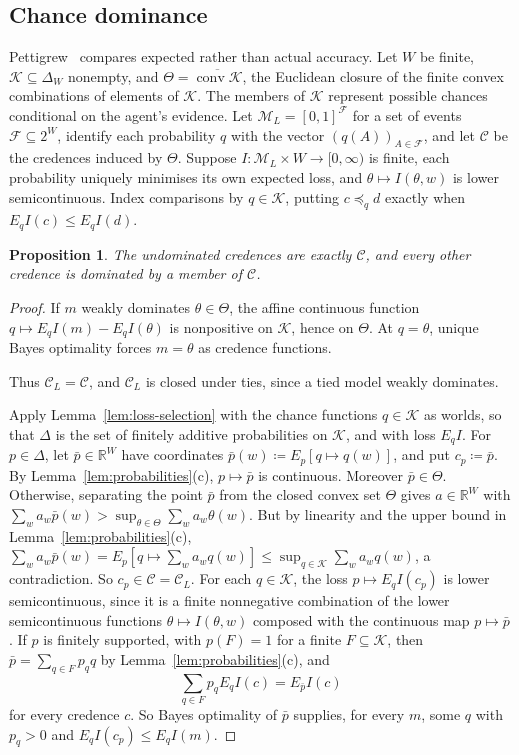 \documentclass[11pt]{article}
\newtheorem{proposition}[theorem]{Proposition}
\theoremstyle{definition}
\theoremstyle{remark}
\newcommand{\M}{\mathcal M}
\newcommand{\C}{\mathcal C}
\begin{document}
\subsection{Chance dominance}\label{sec:chance}
Pettigrew~\cite[Chapter~10]{Pettigrew2016} compares expected rather than actual accuracy. Let $W$ be finite, $\mathcal K\subseteq\Delta_W$ nonempty, and $\Theta=\overline{\operatorname{conv}\mathcal K}$, the Euclidean closure of the finite convex combinations of elements of $\mathcal K$. The members of $\mathcal K$ represent possible chances conditional on the agent's evidence. Let $\M_L=[0,1]^{\mathcal F}$ for a set of events $\mathcal F\subseteq2^W$, identify each probability $q$ with the vector $(q(A))_{A\in\mathcal F}$, and let $\C$ be the credences induced by $\Theta$. Suppose $I:\M_L\times W\to[0,\infty)$ is finite, each probability uniquely minimises its own expected loss, and $\theta\mapsto I(\theta,w)$ is lower semicontinuous. Index comparisons by $q\in\mathcal K$, putting $c\preceq_q d$ exactly when $E_qI(c)\le E_qI(d)$.
\begin{proposition}\label{prop:short-chance}
The undominated credences are exactly $\C$, and every other credence is dominated by a member of $\C$.
\end{proposition}
\begin{proof}
If $m$ weakly dominates $\theta\in\Theta$, the affine continuous function $q\mapsto E_qI(m)-E_qI(\theta)$ is nonpositive on $\mathcal K$, hence on $\Theta$. At $q=\theta$, unique Bayes optimality forces $m=\theta$ as credence functions. {Thus $\C_L=\C$, and $\C_L$ is closed under ties, since a tied model weakly dominates.

Apply Lemma~\ref{lem:loss-selection} with the chance functions $q\in\mathcal K$ as worlds, so that $\Delta$ is the set of finitely additive probabilities on $\mathcal K$, and with loss $E_qI$. For $p\in\Delta$, let $\bar p\in\mathbb R^W$ have coordinates $\bar p(w)\coloneqq E_p[q\mapsto q(w)]$, and put $c_p\coloneqq\bar p$. By Lemma~\ref{lem:probabilities}(c), $p\mapsto\bar p$ is continuous. Moreover $\bar p\in\Theta$. Otherwise, separating the point $\bar p$ from the closed convex set $\Theta$ gives $a\in\mathbb R^W$ with $\sum_wa_w\bar p(w)>\sup_{\theta\in\Theta}\sum_wa_w\theta(w)$. But by linearity and the upper bound in Lemma~\ref{lem:probabilities}(c), $\sum_wa_w\bar p(w)=E_p[q\mapsto\sum_wa_wq(w)]\le\sup_{q\in\mathcal K}\sum_wa_wq(w)$, a contradiction. So $c_p\in\C=\C_L$. For each $q\in\mathcal K$, the loss $p\mapsto E_qI(c_p)$ is lower semicontinuous, since it is a finite nonnegative combination of the lower semicontinuous functions $\theta\mapsto I(\theta,w)$ composed with the continuous map $p\mapsto\bar p$. If $p$ is finitely supported, with $p(F)=1$ for a finite $F\subseteq\mathcal K$, then $\bar p=\sum_{q\in F}p_qq$ by Lemma~\ref{lem:probabilities}(c), and
\[
\sum_{q\in F}p_qE_qI(c)=E_{\bar p}I(c)
\]
for every credence $c$. So Bayes optimality of $\bar p$ supplies, for every $m$, some $q$ with $p_q>0$ and $E_qI(c_p)\le E_qI(m)$.}
\end{proof}


\end{document}
